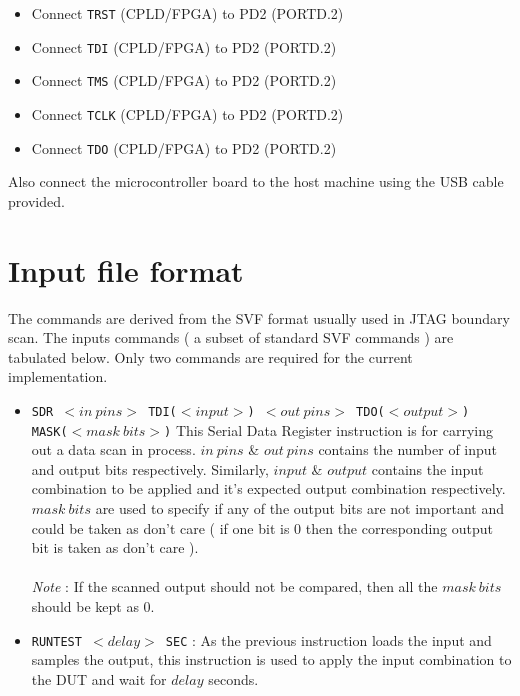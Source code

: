 \documentclass[a4paper,11pt]{article}
\begin{document}
\begin{itemize}
\item Connect \texttt{TRST} (CPLD/FPGA) to PD2 (PORTD.2)
\item Connect \texttt{TDI} (CPLD/FPGA) to PD2 (PORTD.2)
\item Connect \texttt{TMS} (CPLD/FPGA) to PD2 (PORTD.2)
\item Connect \texttt{TCLK} (CPLD/FPGA) to PD2 (PORTD.2)
\item Connect \texttt{TDO} (CPLD/FPGA) to PD2 (PORTD.2)
\end{itemize}

Also connect the microcontroller board to the host machine using the USB cable provided.

\section{Input file format}
The commands are derived from the SVF format usually used in JTAG boundary scan. The inputs commands ( a subset of standard SVF commands ) are tabulated below. Only two commands are required for the current implementation.

\begin{itemize}
 \item \texttt{SDR $<in\:pins>$ TDI($<input>$) $<out\:pins>$ TDO($<output>$) MASK($<mask\:bits>$)}
	\vspace*{0.3cm}
	\newline This Serial Data Register instruction is for carrying out a data scan in process. $in\:pins$ \& $out\:pins$ contains the number of input and output bits respectively. Similarly, $input$ \& $output$ contains the input combination to be applied and it's expected output combination respectively. $mask\:bits$ are used to specify if any of the output bits are not important and could be taken as don't care ( if one bit is 0 then the corresponding output bit is taken as don't care ).
\paragraph*{}
\textit{Note} : If the scanned output should not be compared, then all the $mask\:bits$ should be kept as 0.
 \item \texttt{RUNTEST $<delay>$ SEC} :
	\vspace*{0.3cm}
	\newline As the previous instruction loads the input and samples the output, this instruction is used to apply the input combination to the DUT and wait for $delay$ seconds.
\end{itemize}
\end{document}
